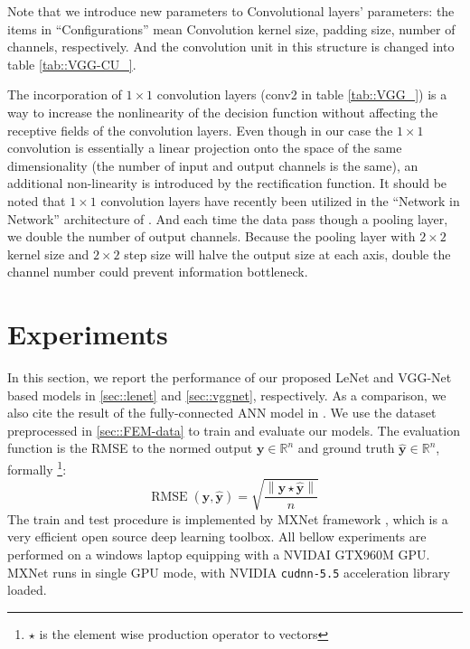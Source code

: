 Note that we introduce new parameters to Convolutional layers' parameters:
the items in ``Configurations'' mean Convolution kernel size, padding size, number of channels, respectively.
And the convolution unit in this structure is changed into table \ref{tab::VGG-CU_}.

The incorporation of $1 \times 1$ convolution layers (conv2 in table \ref{tab::VGG_}) is a way to increase the nonlinearity
of the decision function without affecting the receptive fields of the convolution layers. Even
though in our case the $1 \times 1$ convolution is essentially a linear projection onto the space of the same
dimensionality (the number of input and output channels is the same), an additional non-linearity is
introduced by the rectification function. It should be noted that $1 \times 1$ convolution layers have recently been
utilized in the ``Network in Network'' architecture of \cite{lin2013network}.
And each time the data pass though a pooling layer, we double the number of output channels.
Because the pooling layer with $2 \times 2$ kernel size and $2 \times 2$ step size will halve the
output size at each axis, double the channel number could prevent information bottleneck.


\section{Experiments} \label{sec::exper}
In this section, we report the performance of our proposed LeNet and VGG-Net based models in \ref{sec::lenet} and \ref{sec::vggnet},
respectively. As a comparison, we also cite the result of the fully-connected ANN model in \cite{Zhang2016Fast}.
We use the dataset preprocessed in \ref{sec::FEM-data} to train and evaluate our models.
The evaluation function is the RMSE to the normed output $\mathbf{y} \in \mathbb{R}^n$ and ground truth $\mathbf{\hat{y}} \in \mathbb{R}^n$,
formally \footnote{$\star$ is the element wise production operator to vectors}:
\[ \textrm{RMSE} \; (\mathbf{y}, \mathbf{\hat{y}}) = 
\sqrt{\frac{\left\| \mathbf{y} \star \mathbf{\hat{y}} \right\|}{n}} \]
The train and test procedure is implemented by MXNet framework \cite{chen2015mxnet}, which is a
very efficient open source deep learning toolbox.
All bellow experiments are performed on a windows laptop equipping with a NVIDAI GTX960M GPU.
MXNet runs in single GPU mode, with NVIDIA \texttt{cudnn-5.5} acceleration library loaded.

